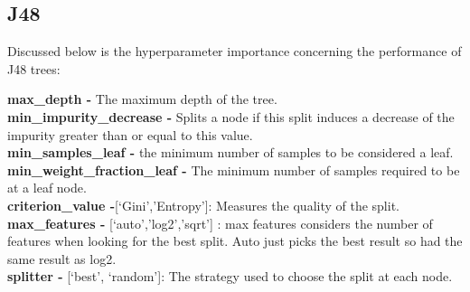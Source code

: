 \documentclass[11pt]{article}
\begin{document}
\subsection{J48}

Discussed below is the hyperparameter \cite{SklearnTreeDecisionTreeClassifier} importance concerning the performance of J48 trees:

\textbf{max\_depth -} The maximum depth of the tree. \\
\textbf{min\_impurity\_decrease -} Splits a node if this split induces a decrease of the impurity greater than or equal to this value. \\
\textbf{min\_samples\_leaf -} the minimum number of samples to be considered a leaf. \\
\textbf{min\_weight\_fraction\_leaf -} The minimum number of samples required to be at a leaf node. \\
\textbf{criterion\_value -}[‘Gini’,’Entropy’]: Measures the quality of the split.
\textbf{max\_features -} [‘auto’,’log2’,’sqrt’] : max features considers the number of features when looking for the best split. Auto just picks the best result so had the same result as log2. \\
\textbf{splitter -} [‘best’, ‘random’]: The strategy used to choose the split at each node. 
\newline
\end{document}
